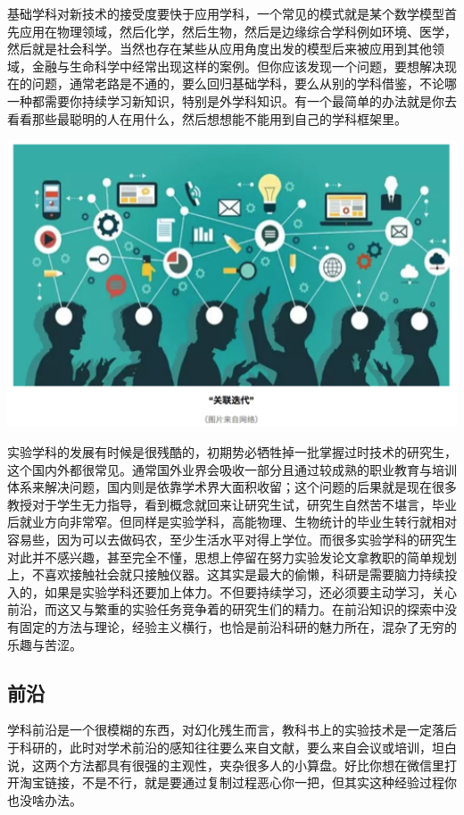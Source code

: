 \documentclass[
]{book}
\begin{document}
基础学科对新技术的接受度要快于应用学科，一个常见的模式就是某个数学模型首先应用在物理领域，然后化学，然后生物，然后是边缘综合学科例如环境、医学，然后就是社会科学。当然也存在某些从应用角度出发的模型后来被应用到其他领域，金融与生命科学中经常出现这样的案例。但你应该发现一个问题，要想解决现在的问题，通常老路是不通的，要么回归基础学科，要么从别的学科借鉴，不论哪一种都需要你持续学习新知识，特别是外学科知识。有一个最简单的办法就是你去看看那些最聪明的人在用什么，然后想想能不能用到自己的学科框架里。

\includegraphics[width=6.67in]{images/hhcs5}

实验学科的发展有时候是很残酷的，初期势必牺牲掉一批掌握过时技术的研究生，这个国内外都很常见。通常国外业界会吸收一部分且通过较成熟的职业教育与培训体系来解决问题，国内则是依靠学术界大面积收留；这个问题的后果就是现在很多教授对于学生无力指导，看到概念就回来让研究生试，研究生自然苦不堪言，毕业后就业方向非常窄。但同样是实验学科，高能物理、生物统计的毕业生转行就相对容易些，因为可以去做码农，至少生活水平对得上学位。而很多实验学科的研究生对此并不感兴趣，甚至完全不懂，思想上停留在努力实验发论文拿教职的简单规划上，不喜欢接触社会就只接触仪器。这其实是最大的偷懒，科研是需要脑力持续投入的，如果是实验学科还要加上体力。不但要持续学习，还必须要主动学习，关心前沿，而这又与繁重的实验任务竞争着的研究生们的精力。在前沿知识的探索中没有固定的方法与理论，经验主义横行，也恰是前沿科研的魅力所在，混杂了无穷的乐趣与苦涩。

\hypertarget{ux524dux6cbf}{%
\subsection{前沿}\label{ux524dux6cbf}}

学科前沿是一个很模糊的东西，对幻化残生而言，教科书上的实验技术是一定落后于科研的，此时对学术前沿的感知往往要么来自文献，要么来自会议或培训，坦白说，这两个方法都具有很强的主观性，夹杂很多人的小算盘。好比你想在微信里打开淘宝链接，不是不行，就是要通过复制过程恶心你一把，但其实这种经验过程你也没啥办法。
\end{document}
